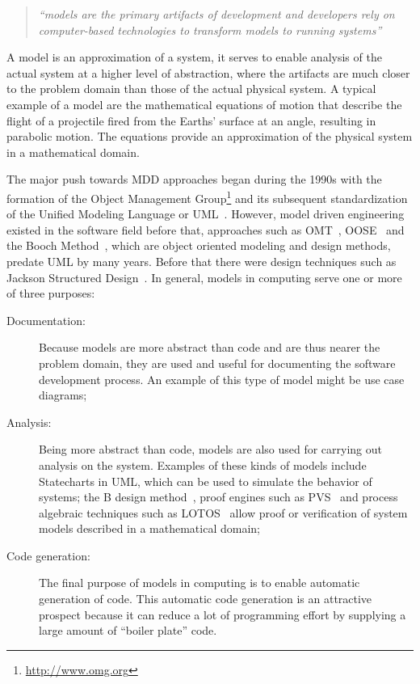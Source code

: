 \begin{quote}
\emph{``models are the primary artifacts of development and developers
  rely on computer-based technologies to transform models to running
  systems''}
\end{quote}

A model is an approximation of a system, it serves to enable analysis
of the actual system at a higher level of abstraction, where the
artifacts are much closer to the problem domain than those of the
actual physical system. A typical example of a model are the
mathematical equations of motion that describe the flight of a
projectile fired from the Earths' surface at an angle, resulting in
parabolic motion. The equations provide an approximation of the
physical system in a mathematical domain.

The major push towards MDD approaches began during the 1990s with the
formation of the Object Management
Group\footnote{\url{http://www.omg.org}} and its subsequent
standardization of the Unified Modeling Language or
UML~\cite{uml-super}. However, model driven engineering existed in the
software field before that, approaches such as
OMT~\cite{bruegge@oopsla92}, OOSE~\cite{jacobson-oose} and the Booch
Method~\cite{white-booch}, which are object oriented modeling and
design methods, predate UML by many years. Before that there were
design techniques such as Jackson Structured
Design~\cite{jackson-jsd}. In general, models in computing serve one
or more of three purposes:

\begin{description}
\item[Documentation:]{Because models are more abstract than code and
  are thus nearer the problem domain, they are used and useful for
  documenting the software development process. An example of this
  type of model might be use case diagrams;}
\item[Analysis:]{Being more abstract than code, models are also used
  for carrying out analysis on the system. Examples of these kinds of
  models include Statecharts in UML, which can be used to simulate the
  behavior of systems; the B design method~\cite{abrial@vdm91,
    sorensen-B}, proof engines such as PVS~\cite{owre@cav96} and
  process algebraic techniques such as LOTOS~\cite{garavel@cav07}
  allow proof or verification of system models described in a
  mathematical domain;}
\item[Code generation:]{The final purpose of models in computing is to
  enable automatic generation of code. This automatic code generation
  is an attractive prospect because it can reduce a lot of programming
  effort by supplying a large amount of ``boiler plate'' code.}
\end{description}

